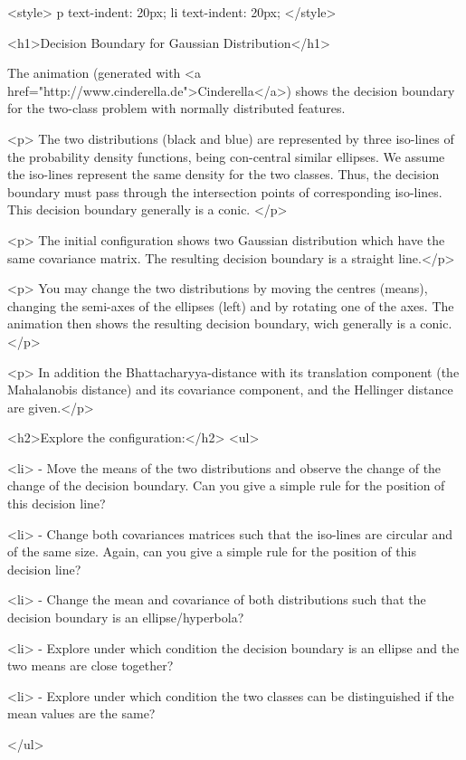 <style>
p {
  text-indent: 20px;
}
li {
  text-indent: 20px;
}
</style>


<h1>Decision Boundary for Gaussian Distribution</h1> 


The animation (generated with <a
    href="http://www.cinderella.de">Cinderella</a>) shows the decision boundary for the two-class problem with normally distributed features.
    
<p>    The two distributions (black and blue) are represented by three iso-lines of the probability density functions, being con-central similar ellipses. We assume the iso-lines represent the same density for the two classes. Thus, the decision boundary must pass through the intersection points of corresponding iso-lines. This decision boundary generally is a conic. </p>
    

<p>    The initial configuration shows two Gaussian distribution which have the same covariance matrix. The resulting decision boundary is a straight line.</p>    
    
<p>    You may change the two distributions by moving the centres (means), changing the semi-axes of the ellipses (left) and by rotating one of the axes. The animation then shows the resulting decision boundary, wich generally is a conic. </p>

<p>   In addition the Bhattacharyya-distance with its translation component (the Mahalanobis distance) and its covariance component, and the Hellinger distance are given.</p>
    
    
    

    <h2>Explore the configuration:</h2>
    <ul>

      <li> - Move the means of the two distributions and observe the change of the change of the 
      decision boundary. Can you give a simple rule for the position of this decision line?
 			
 			<li> - Change both covariances matrices such that the iso-lines are circular and of the 
 			same size. Again, can you give a simple rule for the position of this decision line?
 			
 			<li> - Change the mean and covariance of both distributions such that the decision 
 			boundary is an ellipse/hyperbola?  
 			
	    <li> - Explore under which condition the decision boundary is an ellipse and the two means 
	    are close together?
	    
	    <li> - Explore under which condition the two classes can be distinguished if the mean 
	    values are the same?
	    
	   
    </ul>
